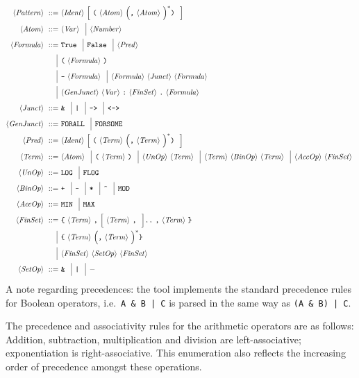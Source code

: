 \documentclass[twoside]{article}
\begin{document}
\begin{align*}
\nonterm{Pattern} ::=\ &\nonterm{Ident} \optional{\term{(} \nonterm{Atom} \group{\term{,} \nonterm{Atom}}^* \term{)}} \\
\nonterm{Atom} ::=\ &\nonterm{Var} \altn \nonterm{Number} \\
\nonterm{Formula} ::=\ & \term{True} \altn \term{False} \altn \nonterm{Pred} \\
                 \altn & \term{(} \nonterm{Formula} \term{)} \\
                 \altn & \term{-} \nonterm{Formula} \altn \nonterm{Formula} \nonterm{Junct} \nonterm{Formula} \\
                 \altn & \nonterm{GenJunct} \nonterm{Var} \term{:} \nonterm{FinSet} \term{.} \nonterm{Formula} \\
\nonterm{Junct} ::=\ & \term{\&} \altn \term{|} \altn \term{->} \altn \term{<->} \\
\nonterm{GenJunct} ::=\ & \term{FORALL} \altn \term{FORSOME} \\
\nonterm{Pred} ::=\ & \nonterm{Ident} \optional{\term{(} \nonterm{Term} \group{\term{,} \nonterm{Term}}^* \term{)}} \\
\nonterm{Term} ::=\ & \nonterm{Atom} \altn \term{(} \nonterm{Term} \term{)} \altn \nonterm{UnOp} \nonterm{Term} \altn \nonterm{Term} \nonterm{BinOp} \nonterm{Term} \altn \nonterm{AccOp} \nonterm{FinSet} \\
\nonterm{UnOp} ::=\ & \term{LOG} \altn \term{FLOG} \\
\nonterm{BinOp} ::=\ &\term{+} \altn \term{-} \altn \term{*} \altn \term{\textasciicircum} \altn \term{MOD} \\
\nonterm{AccOp} ::=\ &\term{MIN} \altn \term{MAX} \\
\nonterm{FinSet} ::=\ & \term{\{} \nonterm{Term} \term{,} \optional{\nonterm{Term} \term{,}} \term{..} \term{,} \nonterm{Term} \term{\}} \\
                \altn & \term{\{} \nonterm{Term} \group{\term{,} \nonterm{Term}}^* \term{\}} \\
                \altn & \nonterm{FinSet} \nonterm{SetOp} \nonterm{FinSet} \\
\nonterm{SetOp} ::=\ & \term{\&} \altn \term{|} \altn{-} 
\end{align*}
A note regarding precedences: the \DiMo tool implements the standard precedence rules for Boolean operators, i.e.\ \texttt{A \& B | C} is parsed in the same way as
\texttt{(A \& B) | C}. 

The precedence and associativity rules for the arithmetic operators are as follows: Addition, subtraction, multiplication and division are left-associative; exponentiation is 
right-associative. This enumeration also reflects the increasing order of precedence amongst these operations.
\end{document}
